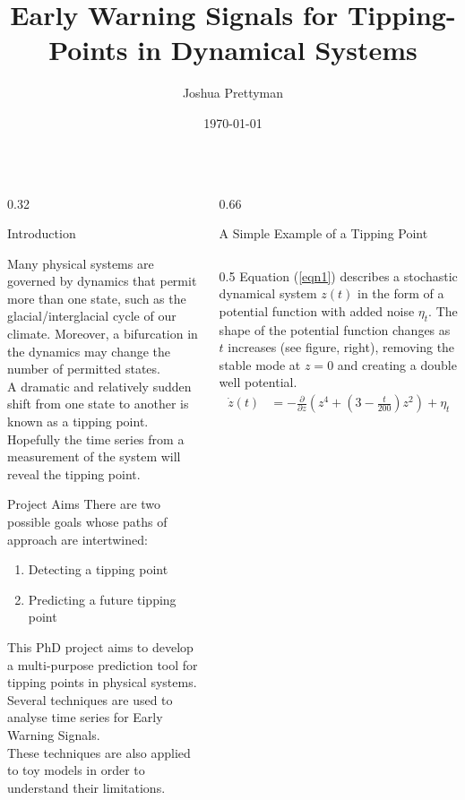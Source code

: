 \documentclass[10pt, final]{beamer}
\title[I like to make posters]{Early Warning Signals for Tipping-Points in Dynamical Systems}
\author[T]{Joshua Prettyman}
\institute[SMS]{University of Reading\\ National Physical Laboratory}
\date{\today}
\begin{document}
\begin{frame}{} 
  \begin{columns}[T]
    \begin{column}{0.32\textwidth}
    		\begin{block}{Introduction}
    		
    		Many physical systems are governed by dynamics that permit more than one state, such as the glacial/interglacial cycle of our climate. Moreover, a bifurcation in the dynamics may change the number of permitted states. \\
    		\vspace{1cm}
    		A dramatic and relatively sudden shift from one state to another is known as a tipping point. Hopefully the time series from a measurement of the system will reveal the tipping point. 
		
    		\end{block}
    		
    		\begin{block}{Project Aims}
    		There are two possible goals whose paths of approach are intertwined:
    		\vspace{1cm}
    			\begin{enumerate}
    			\setlength{\itemindent}{3em}
    			\item Detecting a tipping point
    			\item Predicting a future tipping point
    			\end{enumerate}
    		\vspace{1cm}
    		This PhD project aims to develop a multi-purpose prediction tool for tipping points in physical systems. Several techniques are used to analyse time series for Early Warning Signals. \\
    		\vspace{0.5cm}
    		These techniques are also applied to toy models in order to understand their limitations. 
    		\end{block}
    		
    \end{column}
    \begin{column}{0.66\textwidth}
    
    
    \begin{block}{A Simple Example of a Tipping Point}
    \begin{columns}[T]
    		\begin{column}{0.5\textwidth}
    Equation (\ref{eqn1}) describes a stochastic dynamical system $z(t)$ in the form of a potential function with added noise $\eta_t$. The shape of the potential function changes as $t$ increases (see figure, right), removing the stable mode at $z=0$ and creating a double well potential.
    \vspace{0.5cm}
\begin{align}
\dot{z}(t) & = -\frac{\partial}{\partial z}(z^4 + \left(3-\frac{t}{200}\right)z^2) + \eta_t
\label{eqn1}
\end{align}
\vspace{0.5cm}


\end{column}
\end{columns}
\end{block}
\end{column}
\end{columns}
\end{frame}
\end{document}
